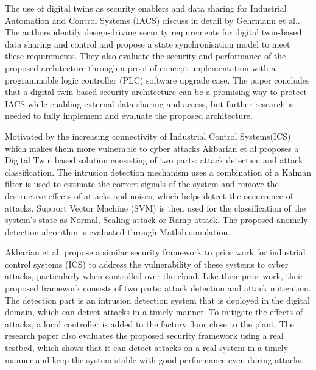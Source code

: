 The use of digital twins as security enablers and data sharing for Industrial Automation and Control Systems (IACS) discuss in detail by Gehrmann et al.\cite{gehrmannDigitalTwinBased2020}. The authors identify design-driving security requirements for digital twin-based data sharing and control and propose a state synchronisation model to meet these requirements. They also evaluate the security and performance of the proposed architecture through a proof-of-concept implementation with a programmable logic controller (PLC) software upgrade case. The paper concludes that a digital twin-based security architecture can be a promising way to protect IACS while enabling external data sharing and access, but further research is needed to fully implement and evaluate the proposed architecture.

Motivated by the increasing connectivity of Industrial Control Systems(ICS) which makes them more vulnerable to cyber attacks Akbarian et al\cite{akbarianIntrusionDetectionDigital2020} proposes a Digital Twin based solution consisting of two parts: attack detection and attack classification. The intrusion detection mechanism uses a combination of a Kalman filter is used  to estimate the correct signals of the system and remove the destructive effects of attacks and noises, which helps detect the occurrence of attacks. Support Vector Machine (SVM) is then used for the classification of the system's state as Normal, Scaling attack or Ramp attack. The proposed anomaly detection algorithm is evaluated through Matlab simulation.

Akbarian et al.\cite{akbarianSecurityFrameworkDigital2021} propose a similar security framework to prior work\cite{akbarianIntrusionDetectionDigital2020} for industrial control systems (ICS) to address the vulnerability of these systems to cyber attacks, particularly when controlled over the cloud. Like their prior work, their proposed framework consists of two parts: attack detection and attack mitigation. The detection part is an intrusion detection system that is deployed in the digital domain, which can detect attacks in a timely manner. To mitigate the effects of attacks, a local controller is added to the factory floor close to the plant. The research paper also evaluates the proposed security framework using a real testbed, which shows that it can detect attacks on a real system in a timely manner and keep the system stable with good performance even during attacks.

